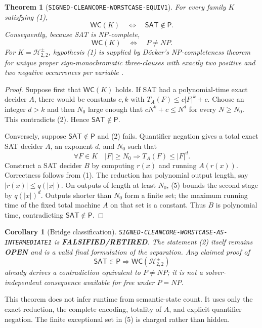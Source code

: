 \documentclass[11pt]{article}
\newtheorem{theorem}{Theorem}
\newtheorem{corollary}{Corollary}
\newcommand{\SAT}{\mathsf{SAT}}
\newcommand{\Hsigned}{\mathcal H^{\pm}_{2,2}}
\newcommand{\OPEN}{\textbf{OPEN}}
\newcommand{\RETIRED}{\textbf{FALSIFIED/RETIRED}}
\begin{document}
\begin{theorem}[\texttt{SIGNED-CLEANCORE-WORSTCASE-EQUIV1}]
For every family $K$ satisfying (1),
\[
 \mathsf{WC}(K)\quad\Longleftrightarrow\quad \SAT\notin\mathsf P.
                                                               \tag{3}
\]
Consequently, because SAT is NP-complete,
\[
 \mathsf{WC}(K)\quad\Longleftrightarrow\quad P\ne NP.          \tag{4}
\]
For $K=\Hsigned$, hypothesis (1) is supplied by D\"ocker's NP-completeness
theorem for unique proper sign-monochromatic three-clauses with exactly two
positive and two negative occurrences per variable \cite{Docker19}.
\end{theorem}

\begin{proof}
Suppose first that $\mathsf{WC}(K)$ holds.  If SAT had a polynomial-time
exact decider $A$, there would be constants $c,k$ with
$T_A(F)\le c|F|^k+c$.  Choose an integer $d>k$ and then $N_0$ large enough
that $cN^k+c\le N^d$ for every $N\ge N_0$.  This contradicts (2).  Hence
$\SAT\notin\mathsf P$.

Conversely, suppose $\SAT\notin\mathsf P$ and (2) fails.  Quantifier
negation gives a total exact SAT decider $A$, an exponent $d$, and $N_0$ such
that
\[
 \forall F\in K\quad |F|\ge N_0\Longrightarrow
 T_A(F)\le |F|^d.                                             \tag{5}
\]
Construct a SAT decider $B$ by computing $r(x)$ and running $A(r(x))$.
Correctness follows from (1).  The reduction has polynomial output length,
say $|r(x)|\le q(|x|)$.  On outputs of length at least $N_0$, (5) bounds the
second stage by $q(|x|)^d$.  Outputs shorter than $N_0$ form a finite set; the
maximum running time of the fixed total machine $A$ on that set is a constant.
Thus $B$ is polynomial time, contradicting $\SAT\notin\mathsf P$.
\end{proof}

\begin{corollary}[Bridge classification]
\texttt{SIGNED-CLEANCORE-WORSTCASE-AS-INTERMEDIATE1} is \RETIRED.  The
statement (2) itself remains \OPEN{} and is a valid final formulation of the
separation.  Any claimed proof of
\[
 \SAT\in\mathsf P\Longrightarrow\mathsf{WC}(\Hsigned)
\]
already derives a contradiction equivalent to $P\ne NP$; it is not a
solver-independent consequence available for free under $P=NP$.
\end{corollary}

This theorem does not infer runtime from semantic-state count.  It uses only
the exact reduction, the complete encoding, totality of $A$, and explicit
quantifier negation.  The finite exceptional set in (5) is charged rather
than hidden.
\end{document}
